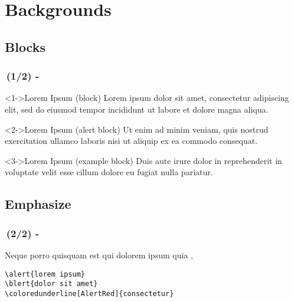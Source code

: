 \documentclass[./main]{subfiles}
\begin{document}
\setcounter{section}{0}
\section[Sec 1]{Backgrounds}




\subsection{Blocks}
\begin{frame}
  \frametitle{\secname\,(1/2) - \subsecname}
  {\small 
    \begin{block}<1->{Lorem Ipsum (block)}
      Lorem ipsum dolor sit amet, consectetur adipiscing elit, sed do eiusmod tempor incididunt ut labore et dolore magna aliqua. 
    \end{block}

    \begin{alertblock}<2->{Lorem Ipsum (alert block)}
      Ut enim ad minim veniam, quis nostrud exercitation ullamco laboris nisi ut aliquip ex ea commodo consequat. 
    \end{alertblock}

    \begin{exampleblock}<3->{Lorem Ipsum (example block)}
      Duis aute irure dolor in reprehenderit in voluptate velit esse cillum dolore eu fugiat nulla pariatur. 
    \end{exampleblock}
  }
\end{frame}




\subsection{Emphasize}
\begin{frame}[containsverbatim]
  \frametitle{\secname\,(2/2) - \subsecname}

  Neque porro quisquam est qui do\alert{lorem ipsum} quia ,  {\scriptsize \citep{tullius1914finibus}}
  
  \begin{verbatim}
\alert{lorem ipsum} 
\blert{dolor sit amet}
\coloredunderline[AlertRed]{consectetur}
  \end{verbatim}


\end{frame}




\ifSubfilesClassLoaded{%
  \begin{frame}
    
  \end{frame}
}{}
\end{document}
